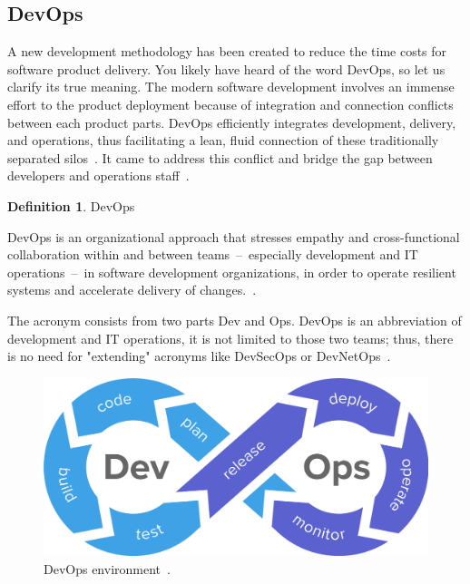 \documentclass[12pt,a4paper]{article}
\theoremstyle{definition}
\newtheorem{definition}{Definition}[section]
\begin{document}
    \subsection{DevOps}

    A new development methodology has been created to reduce the time costs for software product delivery. You likely have heard of the word DevOps, so let us clarify its true meaning. The modern software development involves an immense effort to the product deployment because of integration and connection conflicts between each product parts. DevOps efficiently integrates development, delivery, and operations, thus facilitating a lean, fluid connection of these traditionally separated silos~\cite{7458761}. It came to address this conflict and bridge the gap between developers and operations staff~\cite{7339039}.

    \begin{definition}
        DevOps\\[-5mm]
        \begin{center}
            \begin{minipage}{0.9\textwidth}
                DevOps is an organizational approach that stresses empathy and cross-functional collaboration within and between teams~--~especially development and IT operations~--~in software development organizations, in order to operate resilient systems and accelerate delivery of changes.~\cite{7169442}.\\[-2.5mm]
            \end{minipage}
        \end{center}
    \end{definition}

    The acronym consists from two parts Dev and Ops. DevOps is an abbreviation of development and IT operations, it is not limited to those two teams; thus, there is no need for "extending" acronyms like DevSecOps or DevNetOps~\cite{7169442}.

    \begin{figure}[H]
        \centering
        \includegraphics[scale=0.25]{img/devops.png}
        \caption{DevOps environment~\cite{devops1}.}
        \label{fig:devops}
    \end{figure}
\end{document}
